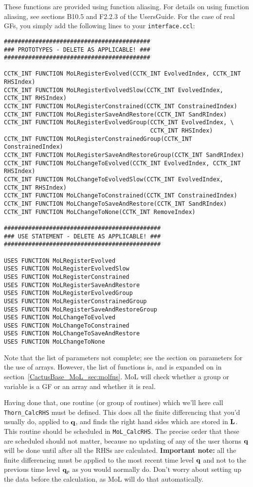 These functions are provided using function aliasing. For details on
using function aliasing, see sections B10.5 and F2.2.3 of the
UsersGuide. For the case of real GFs, you simply add the following
lines to your \texttt{interface.ccl}:
\begin{verbatim}
##########################################
### PROTOTYPES - DELETE AS APPLICABLE! ###
##########################################

CCTK_INT FUNCTION MoLRegisterEvolved(CCTK_INT EvolvedIndex, CCTK_INT RHSIndex)
CCTK_INT FUNCTION MoLRegisterEvolvedSlow(CCTK_INT EvolvedIndex, CCTK_INT RHSIndex)
CCTK_INT FUNCTION MoLRegisterConstrained(CCTK_INT ConstrainedIndex)
CCTK_INT FUNCTION MoLRegisterSaveAndRestore(CCTK_INT SandRIndex)
CCTK_INT FUNCTION MoLRegisterEvolvedGroup(CCTK_INT EvolvedIndex, \
                                          CCTK_INT RHSIndex)
CCTK_INT FUNCTION MoLRegisterConstrainedGroup(CCTK_INT ConstrainedIndex)
CCTK_INT FUNCTION MoLRegisterSaveAndRestoreGroup(CCTK_INT SandRIndex)
CCTK_INT FUNCTION MoLChangeToEvolved(CCTK_INT EvolvedIndex, CCTK_INT RHSIndex)
CCTK_INT FUNCTION MoLChangeToEvolvedSlow(CCTK_INT EvolvedIndex, CCTK_INT RHSIndex)
CCTK_INT FUNCTION MoLChangeToConstrained(CCTK_INT ConstrainedIndex)
CCTK_INT FUNCTION MoLChangeToSaveAndRestore(CCTK_INT SandRIndex)
CCTK_INT FUNCTION MoLChangeToNone(CCTK_INT RemoveIndex)

#############################################
### USE STATEMENT - DELETE AS APPLICABLE! ###
#############################################

USES FUNCTION MoLRegisterEvolved
USES FUNCTION MoLRegisterEvolvedSlow
USES FUNCTION MoLRegisterConstrained
USES FUNCTION MoLRegisterSaveAndRestore
USES FUNCTION MoLRegisterEvolvedGroup
USES FUNCTION MoLRegisterConstrainedGroup
USES FUNCTION MoLRegisterSaveAndRestoreGroup
USES FUNCTION MoLChangeToEvolved
USES FUNCTION MoLChangeToConstrained
USES FUNCTION MoLChangeToSaveAndRestore
USES FUNCTION MoLChangeToNone
\end{verbatim}

Note that the list of parameters not complete; see the section on
parameters for the use of arrays. However, the
list of functions is, and is expanded on in
section~\ref{CactusBase_MoL_sec:molfns}.  MoL will check whether a
group or variable is a GF or an array and whether it is real.

Having done that, one routine (or group of routines) which we'll here
call {\tt Thorn\_CalcRHS} must be defined. This does all the finite
differencing that you'd usually do, applied to ${\bf q}$, and finds
the right hand sides which are stored in ${\bf L}$. This routine
should be scheduled in {\tt MoL\_CalcRHS}. The precise order that
these are scheduled should not matter, because no updating of any of
the user thorns ${\bf q}$ will be done until after all the RHSs are
calculated. {\bf Important note:} all the finite differencing must be
applied to the most recent time level ${\bf q}$ and not to the
previous time level ${\bf q}_p$ as you would normally do. Don't worry
about setting up the data before the calculation, as MoL will do that
automatically.

